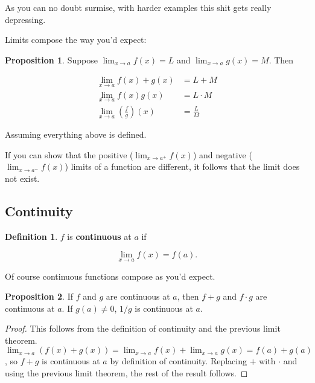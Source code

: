 \documentclass{article}
\theoremstyle{definition}
\newtheorem{definition}{Definition}[section]
\newtheorem{proposition}{Proposition}[section]
\begin{document}
As you can no doubt surmise, with harder examples this shit gets really depressing.

Limits compose the way you'd expect:
\begin{proposition}
Suppose $\lim_{x \to a} f(x) = L$ and $\lim_{x \to a} g(x) = M$. Then

\begin{align}
\lim_{x \to a} f(x) + g(x) & = L + M \\
\lim_{x \to a} f(x)g(x) & = L \cdot M \\
\lim_{x \to a} \left(\frac{f}{g}\right)(x) & = \frac{L}{M}
\end{align}

Assuming everything above is defined.

\end{proposition}

If you can show that the positive ($\lim_{x \to a^{+}} f(x)$) and negative
($\lim_{x \to a^{-}} f(x) $) limits of a function are
different, it follows that the limit does not exist.


\subsection{Continuity}

\begin{definition}

$f$ is \textbf{continuous} at $a$ if

\begin{equation}
\lim_{x \to a} f(x) = f(a).
\end{equation}

\end{definition}

Of course continuous functions compose as you'd expect.

\begin{proposition}

If $f$ and $g$ are continuous at $a$, then $f+g$ and $f \cdot g$ are continuous
at $a$. If $g(a) \neq 0$, $1/g$ is continuous at $a$.

\end{proposition}

\begin{proof}

This follows from the definition of continuity and the previous limit
theorem. $\lim_{x \to a} (f(x) + g(x)) = \lim_{x \to a} f(x) + \lim_{x \to a}
g(x) = f(a) + g(a)$, so $f + g$ is continuous at $a$ by definition of
continuity. Replacing $+$ with $\cdot$ and using the previous limit theorem, the
rest of the result follows.

\end{proof}
\end{document}
